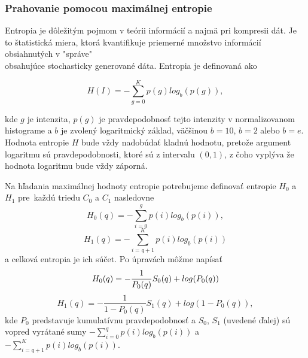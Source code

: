 \documentclass[a4paper,11pt,oneside]{article}%
\begin{document}
\subsubsection{Prahovanie pomocou maximálnej entropie} \label{kapurM}

Entropia je dôležitým pojmom v teórii informácií a najmä pri kompresii dát. Je to štatistická miera, ktorá kvantifikuje priemerné množstvo informácií obsiahnutých v  "správe" \\ obsahujúce stochasticky generované dáta. Entropia je definovaná ako

\begin{equation}
H(I)= -\sum_{g=0}^K p(g)log_b(p(g)),
\end{equation}


kde $g$ je intenzita, $p(g)$ je pravdepodobnosť tejto intenzity v normalizovanom histograme a $b$ je zvolený logaritmický základ, väčšinou $b=10$, $b=2$  alebo $b=e$. Hodnota entropie $H$ bude vždy nadobúdať kladnú hodnotu, pretože argument logaritmu sú pravdepodobnosti, ktoré sú z intervalu $(0,1)$, z čoho vyplýva že hodnota logaritmu bude vždy záporná. 

Na hľadania maximálnej hodnoty entropie potrebujeme definovať entropie $H_0$ a $H_1$ pre~každú triedu $C_0$ a $C_1$ nasledovne
\begin{equation}
H_0(q)= -\sum_{i=0}^g p(i)log_b(p(i)),
\end{equation}
\begin{equation}
H_1(q)= -\sum_{i=q+1}^K p(i)log_b(p(i))
\end{equation}
a celková entropia je ich súčet.
Po úpravách môžme napísať \cite{ skripta1,kapur}
\begin{equation}
H_0(q) =  -\frac{1}{P_0(q)}S_0(q)+log(P_0(q)) \\
\end{equation}
\begin{equation}
H_1(q) =  -\frac{1}{1-P_0(q)}S_1(q)+log(1-P_0(q)),
\end{equation}
kde $P_0$ predstavuje kumulatívnu pravdepodobnosť a $S_0$, $S_1$ (uvedené ďalej) sú vopred vyrátané sumy  $  -\sum_{i=0}^q p(i)log_b(p(i)) $ a $  -\sum_{i=q+1}^K p(i)log_b(p(i)) $.
 
\end{document}
